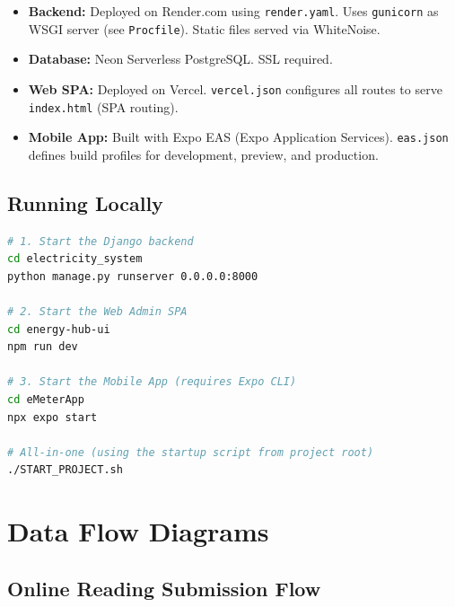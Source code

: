 \documentclass[12pt, a4paper]{report}
\begin{document}
\begin{itemize}[leftmargin=1.5em, itemsep=4pt]
    \item \textbf{Backend:} Deployed on Render.com using \texttt{render.yaml}. Uses \texttt{gunicorn} as WSGI server (see \texttt{Procfile}). Static files served via WhiteNoise.
    \item \textbf{Database:} Neon Serverless PostgreSQL. SSL required.
    \item \textbf{Web SPA:} Deployed on Vercel. \texttt{vercel.json} configures all routes to serve \texttt{index.html} (SPA routing).
    \item \textbf{Mobile App:} Built with Expo EAS (Expo Application Services). \texttt{eas.json} defines build profiles for development, preview, and production.
\end{itemize}

\section{Running Locally}

\begin{lstlisting}[language=bash]
# 1. Start the Django backend
cd electricity_system
python manage.py runserver 0.0.0.0:8000

# 2. Start the Web Admin SPA
cd energy-hub-ui
npm run dev

# 3. Start the Mobile App (requires Expo CLI)
cd eMeterApp
npx expo start

# All-in-one (using the startup script from project root)
./START_PROJECT.sh
\end{lstlisting}

\chapter{Data Flow Diagrams}

\section{Online Reading Submission Flow}
\end{document}
